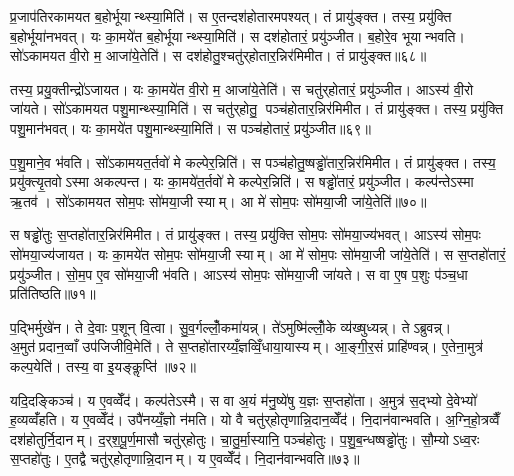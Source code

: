 प्र॒जाप॑तिरकामयत ब॒होर्भूयान्थ्स्या॒मिति॑। स ए॒तन्दश॑होतारमपश्यत्। तं प्रायु॑ङ्क्त। तस्य॒ प्रयु॑क्ति ब॒होर्भूया॑नभवत्। यः का॒मये॑त ब॒होर्भूयान्थ्स्या॒मिति॑। स दश॑होतारं॒ प्रयु॑ञ्जीत। ब॒होरे॒व भूयान्भवति। सो॑ऽकामयत वी॒रो म॒ आजा॑ये॒तेति॑। स दश॑होतु॒श्चतु॑र्‌होतार॒न्निर॑मिमीत। तं प्रायु॑ङ्क्त॥६८॥

तस्य॒ प्रयु॒क्तीन्द्रो॑ऽजायत। यः का॒मये॑त वी॒रो म॒ आजा॑ये॒तेति॑। स चतु॑र्‌होतारं॒ प्रयु॑ञ्जीत। आऽस्य॑ वी॒रो जा॑यते। सो॑ऽकामयत पशु॒मान्थ्स्या॒मिति॑। स चतु॑र्‌होतु॒ पञ्च॑होतार॒न्निर॑मिमीत। तं प्रायु॑ङ्क्त। तस्य॒ प्रयु॑क्ति पशु॒मान॑भवत्। यः का॒मये॑त पशु॒मान्थ्स्या॒मिति॑। स पञ्च॑होतारं॒ प्रयु॑ञ्जीत॥६९॥

प॒शु॒माने॒व भ॑वति। सो॑ऽकामयत॒र्तवो॑ मे कल्पेर॒न्निति॑। स पञ्च॑होतु॒ष्षड्ढो॑तार॒न्निर॑मिमीत। तं प्रायु॑ङ्क्त। तस्य॒ प्रयु॑क्त्यृ॒तवोऽस्मा अकल्पन्त। यः का॒मये॑त॒र्तवो॑ मे कल्पेर॒न्निति॑। स षड्ढो॑तारं॒ प्रयु॑ञ्जीत। कल्प॑न्तेऽस्मा ऋ॒तव॑। सो॑ऽकामयत सोम॒पः सो॑मया॒जी स्याम्। आ मे॑ सोम॒पः सो॑मया॒जी जा॑ये॒तेति॑॥७०॥

स षड्ढो॑तुः स॒प्तहो॑तार॒न्निर॑मिमीत। तं प्रायु॑ङ्क्त। तस्य॒ प्रयु॑क्ति सोम॒पः सो॑मया॒ज्य॑भवत्। आऽस्य॑ सोम॒पः सो॑मया॒ज्य॑जायत। यः का॒मये॑त सोम॒पः सो॑मया॒जी स्याम्। आ मे॑ सोम॒पः सो॑मया॒जी जा॑ये॒तेति॑। स स॒प्तहो॑तारं॒ प्रयु॑ञ्जीत। सो॒म॒प ए॒व सो॑मया॒जी भ॑वति। आऽस्य॑ सोम॒पः सो॑मया॒जी जा॑यते। स वा ए॒ष प॒शुः प॑ञ्च॒धा प्रति॑तिष्ठति॥७१॥

प॒द्भिर्मुखे॑न। ते दे॒वाः प॒शून् वि॒त्वा। सु॒व॒र्गल्लोँ॒कमा॑यन्न्। ते॑ऽमुष्मि॑ल्लोँ॒के व्य॑ख्षुध्यन्न्। तेऽब्रुवन्न्। अ॒मुत॑प्रदान॒व्वाँ उप॑जिजीवि॒मेति॑। ते स॒प्तहो॑तारय्यँ॒ज्ञव्विँ॒धाया॒यास्यम्। आ॒ङ्गी॒र॒सं प्राहि॑ण्वन्न्। ए॒तेना॒मुत्र॑ कल्प॒येति॑। तस्य॒ वा इ॒यङ्कॢप्ति॑॥७२॥

यदि॒दङ्किञ्च॑। य ए॒वव्वेँद॑। कल्प॑तेऽस्मै। स वा अ॒यं म॑नु॒ष्ये॑षु य॒ज्ञः स॒प्तहो॑ता। अ॒मुत्र॑ स॒द्भ्यो दे॒वेभ्यो॑ ह॒व्यव्वँ॑हति। य ए॒वव्वेँद॑। उपै॑नय्यँ॒ज्ञो न॑मति। यो वै चतु॑र्‌होतृणान्नि॒दान॒व्वेँद॑। नि॒दान॑वान्भवति। अ॒ग्नि॒हो॒त्रव्वैँ दश॑होतुर्नि॒दानम्। द॒र्‌श॒पू॒र्ण॒मासौ चतु॑र्‌होतुः। चा॒तु॒र्मा॒स्यानि॒ पञ्च॑होतुः। प॒शु॒ब॒न्धष्षड्ढो॑तुः। सौ॒म्योऽध्व॒रः स॒प्तहो॑तुः। ए॒तद्वै चतु॑र्‌होतृणान्नि॒दानम्। य ए॒वव्वेँद॑। नि॒दान॑वान्भवति॥७३॥


